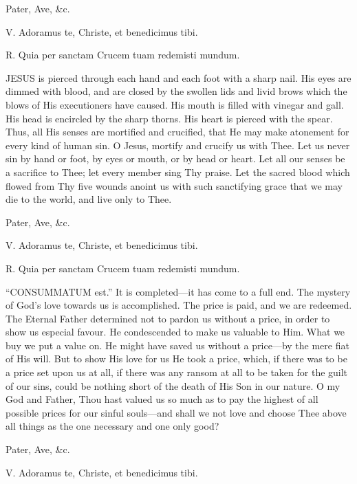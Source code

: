 Pater, Ave, \&c.


V. Adoramus te, Christe, et
benedicimus tibi.

R. Quia per sanctam Crucem tuam redemisti mundum.

JESUS is pierced
through each hand and each foot with a sharp nail. His eyes are dimmed
with blood, and are closed by the swollen lids and livid brows which the
blows of His executioners have caused. His mouth is filled with vinegar
and gall. His head is encircled by the sharp thorns. His heart is
pierced with the spear. Thus, all His senses are mortified and
crucified, that He may make atonement for every kind of human sin. O
Jesus, mortify and crucify us with Thee. Let us never sin by hand or
foot, by eyes or mouth, or by head or heart. Let all our senses be a
sacrifice to Thee; let every member sing Thy praise. Let the sacred
blood which flowed from Thy five wounds anoint us with such sanctifying
grace that we may die to the world, and live only to Thee.

Pater, Ave, \&c.


V. Adoramus te, Christe, et
benedicimus tibi.

R. Quia per sanctam Crucem tuam redemisti mundum.

``CONSUMMATUM est.'' It
is completed—it has come to a full end. The mystery of God's love
towards us is accomplished. The price is paid, and we are redeemed. The
Eternal Father determined not to pardon us without a price, in order to
show us especial favour. He condescended to make us valuable to Him.
What we buy we put a value on. He might have saved us without a
price—by the mere fiat of His will. But to show His love for us He
took a price, which, if there was to be a price set upon us at all, if
there was any ransom at all to be taken for the guilt of our sins, could
be nothing short of the death of His Son in our nature. O my God and
Father, Thou hast valued us so much as to pay the highest of all
possible prices for our sinful souls—and shall we not love and choose
Thee above all things as the one necessary and one only good?

Pater, Ave, \&c.


V. Adoramus te, Christe, et
benedicimus tibi.

